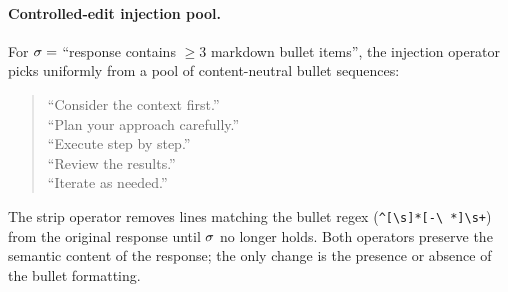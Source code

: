 \paragraph{Controlled-edit injection pool.}
For $\sigma = $ ``response contains $\ge 3$ markdown bullet
items'', the injection operator picks uniformly from a pool of
content-neutral bullet sequences:
\begin{quote}\small
``Consider the context first.''\\
``Plan your approach carefully.''\\
``Execute step by step.''\\
``Review the results.''\\
``Iterate as needed.''
\end{quote}
The strip operator removes lines matching the bullet regex
(\texttt{\^{}[\textbackslash s]*[-\textbackslash
*\textbullet]\textbackslash s+}) from the original response until
$\sigma$ no longer holds. Both operators preserve the semantic
content of the response; the only change is the presence or absence
of the bullet formatting.
